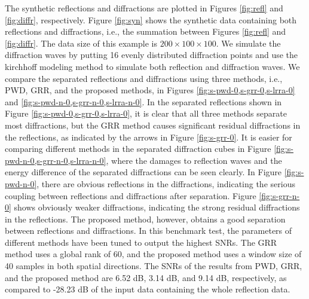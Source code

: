 The synthetic reflections and diffractions are plotted in Figures \ref{fig:refl} and \ref{fig:diffr}, respectively. Figure \ref{fig:syn} shows the synthetic data containing both reflections and diffractions, i.e., the summation between Figures \ref{fig:refl} and \ref{fig:diffr}. The data size of this example is $200\times 100\times 100$. We simulate the diffraction waves by putting 16 evenly distributed diffraction points and use the kirchhoff modeling method to simulate both reflection and diffraction waves. We compare the separated reflections and diffractions using three methods, i.e., PWD, GRR, and the proposed methods, in Figures \ref{fig:s-pwd-0,s-grr-0,s-lrra-0} and \ref{fig:s-pwd-n-0,s-grr-n-0,s-lrra-n-0}. 
In the separated reflections shown in Figure \ref{fig:s-pwd-0,s-grr-0,s-lrra-0}, it is clear that all three methods separate most diffractions, but the GRR method causes significant residual diffractions in the reflections, as indicated by the arrows in Figure \ref{fig:s-grr-0}. 
It is easier for comparing different methods in the separated diffraction cubes in Figure \ref{fig:s-pwd-n-0,s-grr-n-0,s-lrra-n-0}, where the damages to reflection waves and the energy difference of the separated diffractions can be seen clearly. In Figure \ref{fig:s-pwd-n-0}, there are obvious reflections in the diffractions, indicating the serious coupling between reflections and diffractions after separation. Figure \ref{fig:s-grr-n-0} shows obviously weaker diffractions, indicating the strong residual diffractions in the reflections. The proposed method, however, obtains a good separation between reflections and diffractions. In this benchmark test, the parameters of different methods have been tuned to output the highest SNRs. The GRR method uses a global rank of 60, and the proposed method uses a window size of 40 samples in both spatial directions. The SNRs of the results from PWD, GRR, and the proposed method are 6.52 dB, 3.14 dB, and 9.14 dB, respectively, as compared to -28.23 dB of the input data containing the whole reflection data. 








